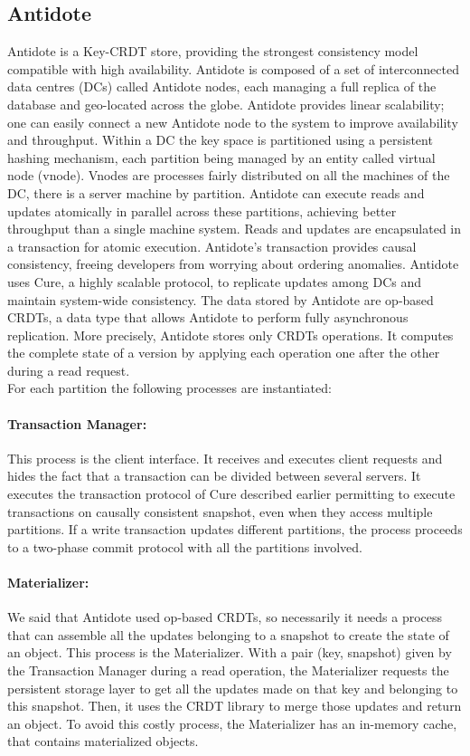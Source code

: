 \documentclass[11pt]{article}
\begin{document}
\subsection{Antidote}

Antidote is a Key-CRDT store, providing the strongest consistency model
compatible with high availability. Antidote is composed of a set of
interconnected data centres (DCs) called Antidote nodes, each managing a full
replica of the database and geo-located across the globe. Antidote provides
linear scalability; one can easily connect a new Antidote node to the system
to improve availability and throughput. Within a DC the key space is
partitioned using a persistent hashing mechanism, each partition being managed
by an entity called virtual node (vnode). Vnodes are processes fairly
distributed on all the machines of the DC, there is a server machine by
partition. Antidote can execute reads and updates atomically in parallel
across these partitions, achieving better throughput than a single machine
system. Reads and updates are encapsulated in a transaction for atomic
execution. Antidote's transaction provides causal consistency, freeing
developers from worrying about ordering anomalies. Antidote uses Cure, a
highly scalable protocol, to replicate updates among DCs and maintain
system-wide consistency. The data stored by Antidote are op-based CRDTs, a
data type that allows Antidote to perform fully asynchronous replication. More
precisely, Antidote stores only CRDTs operations. It computes the complete
state of a version by applying each operation one after the other during a
read request.\\
For each partition the following processes are instantiated:

\paragraph{Transaction Manager:} 
This process is the client interface. It receives and executes client requests
and hides the fact that a transaction can be divided between several servers.
It executes the transaction protocol of Cure described earlier permitting to
execute transactions on causally consistent snapshot, even when they access
multiple partitions. If a write transaction updates different partitions, the
process proceeds to a two-phase commit protocol with all the partitions
involved.

\paragraph{Materializer:}
We said that Antidote used op-based CRDTs, so necessarily it needs a process
that can assemble all the updates belonging to a snapshot to create the state
of an object. This process is the Materializer. With a pair (key, snapshot)
given by the Transaction Manager during a read operation, the Materializer
requests the persistent storage layer to get all the updates made on that key
and belonging to this snapshot. Then, it uses the CRDT library to merge those
updates and return an object. To avoid this costly process, the Materializer
has an in-memory cache, that contains materialized objects.
\end{document}
